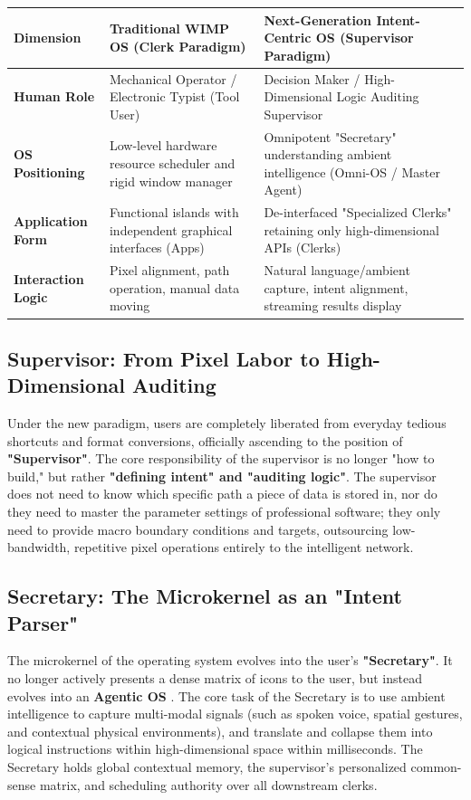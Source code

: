 \documentclass[11pt,a4paper]{article}
\begin{document}
\begin{table}[h]
\centering
\small
\renewcommand{\arraystretch}{1.3}
\begin{tabularx}{\textwidth}{@{}lXX@{}}
\toprule
\textbf{Dimension} & \textbf{Traditional WIMP OS (Clerk Paradigm)} & \textbf{Next-Generation Intent-Centric OS (Supervisor Paradigm)} \\ \midrule
\textbf{Human Role} & Mechanical Operator / Electronic Typist (Tool User) & Decision Maker / High-Dimensional Logic Auditing Supervisor \\
\textbf{OS Positioning} & Low-level hardware resource scheduler and rigid window manager & Omnipotent "Secretary" understanding ambient intelligence (Omni-OS / Master Agent) \\
\textbf{Application Form} & Functional islands with independent graphical interfaces (Apps) & De-interfaced "Specialized Clerks" retaining only high-dimensional APIs (Clerks) \\
\textbf{Interaction Logic} & Pixel alignment, path operation, manual data moving & Natural language/ambient capture, intent alignment, streaming results display \\ \bottomrule
\end{tabularx}
\end{table}

\subsection{Supervisor: From Pixel Labor to High-Dimensional Auditing}

Under the new paradigm, users are completely liberated from everyday tedious shortcuts and format conversions, officially ascending to the position of \textbf{"Supervisor"}. The core responsibility of the supervisor is no longer "how to build," but rather \textbf{"defining intent" and "auditing logic"}. The supervisor does not need to know which specific path a piece of data is stored in, nor do they need to master the parameter settings of professional software; they only need to provide macro boundary conditions and targets, outsourcing low-bandwidth, repetitive pixel operations entirely to the intelligent network.

\subsection{Secretary: The Microkernel as an "Intent Parser"}

The microkernel of the operating system evolves into the user's \textbf{"Secretary"}. It no longer actively presents a dense matrix of icons to the user, but instead evolves into an \textbf{Agentic OS} \cite{xi2023}. The core task of the Secretary is to use ambient intelligence to capture multi-modal signals (such as spoken voice, spatial gestures, and contextual physical environments), and translate and collapse them into logical instructions within high-dimensional space within milliseconds. The Secretary holds global contextual memory, the supervisor's personalized common-sense matrix, and scheduling authority over all downstream clerks.
\end{document}
